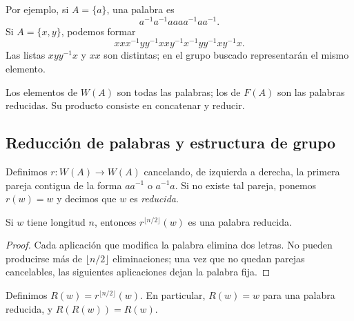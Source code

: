 Por ejemplo, si $A=\{a\}$, una palabra es
\[
a^{-1}a^{-1}aaaa^{-1}aa^{-1}.
\]
Si $A=\{x,y\}$, podemos formar
\[
xxx^{-1}yy^{-1}xxy^{-1}x^{-1}yy^{-1}xy^{-1}x.
\]
Las listas $xyy^{-1}x$ y $xx$ son distintas; en el grupo buscado representarán el mismo elemento.

\begin{obs}
Los elementos de $W(A)$ son todas las palabras; los de $F(A)$ son las palabras reducidas. Su producto consiste en concatenar y reducir.
\end{obs}

\subsection{Reducción de palabras y estructura de grupo}\label{tema:3-4-1}\label{tema:3-4-2}
Definimos $r:W(A)\to W(A)$ cancelando, de izquierda a derecha, la primera pareja contigua de la forma $aa^{-1}$ o $a^{-1}a$. Si no existe tal pareja, ponemos $r(w)=w$ y decimos que $w$ es \emph{reducida}.

\begin{lema}
Si $w$ tiene longitud $n$, entonces $r^{\lfloor n/2\rfloor}(w)$ es una palabra reducida.
\end{lema}
\begin{proof}
Cada aplicación que modifica la palabra elimina dos letras. No pueden producirse más de $\lfloor n/2\rfloor$ eliminaciones; una vez que no quedan parejas cancelables, las siguientes aplicaciones dejan la palabra fija.
\end{proof}
Definimos $R(w)=r^{\lfloor n/2\rfloor}(w)$. En particular, $R(w)=w$ para una palabra reducida, y $R(R(w))=R(w)$.

